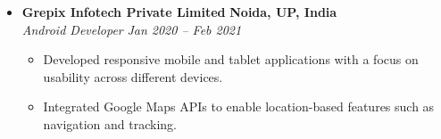 \documentclass[10pt, a4paper]{article}
\begin{document}
\begin{itemize}[leftmargin=0pt, itemsep=1ex, topsep=0.5ex, partopsep=0pt]
    \item
    \textbf{Grepix Infotech Private Limited} \hfill \textbf{Noida, UP, India} \\
    \textit{Android Developer} \hfill \textit{Jan 2020 -- Feb 2021}
    \begin{itemize}[leftmargin=1.5em, itemsep=0.5ex, topsep=0.5ex]
        \item Developed responsive mobile and tablet applications with a focus on usability across different devices.
        \item Integrated Google Maps APIs to enable location-based features such as navigation and tracking.
    \end{itemize}

\end{itemize}

\newpage

\end{document}
